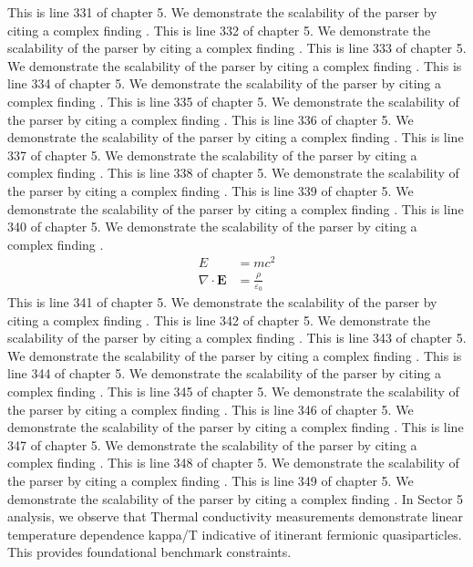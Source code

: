 This is line 331 of chapter 5. We demonstrate the scalability of the parser by citing a complex finding \cite{ref5_331}.
This is line 332 of chapter 5. We demonstrate the scalability of the parser by citing a complex finding \cite{ref5_332}.
This is line 333 of chapter 5. We demonstrate the scalability of the parser by citing a complex finding \cite{ref5_333}.
This is line 334 of chapter 5. We demonstrate the scalability of the parser by citing a complex finding \cite{ref5_334}.
This is line 335 of chapter 5. We demonstrate the scalability of the parser by citing a complex finding \cite{ref5_335}.
This is line 336 of chapter 5. We demonstrate the scalability of the parser by citing a complex finding \cite{ref5_336}.
This is line 337 of chapter 5. We demonstrate the scalability of the parser by citing a complex finding \cite{ref5_337}.
This is line 338 of chapter 5. We demonstrate the scalability of the parser by citing a complex finding \cite{ref5_338}.
This is line 339 of chapter 5. We demonstrate the scalability of the parser by citing a complex finding \cite{ref5_339}.
This is line 340 of chapter 5. We demonstrate the scalability of the parser by citing a complex finding \cite{ref5_340}.
\begin{align*}
  E &= mc^2 \\
  \nabla \cdot \mathbf{E} &= \frac{\rho}{\varepsilon_0}
\end{align*}
This is line 341 of chapter 5. We demonstrate the scalability of the parser by citing a complex finding \cite{ref5_341}.
This is line 342 of chapter 5. We demonstrate the scalability of the parser by citing a complex finding \cite{ref5_342}.
This is line 343 of chapter 5. We demonstrate the scalability of the parser by citing a complex finding \cite{ref5_343}.
This is line 344 of chapter 5. We demonstrate the scalability of the parser by citing a complex finding \cite{ref5_344}.
This is line 345 of chapter 5. We demonstrate the scalability of the parser by citing a complex finding \cite{ref5_345}.
This is line 346 of chapter 5. We demonstrate the scalability of the parser by citing a complex finding \cite{ref5_346}.
This is line 347 of chapter 5. We demonstrate the scalability of the parser by citing a complex finding \cite{ref5_347}.
This is line 348 of chapter 5. We demonstrate the scalability of the parser by citing a complex finding \cite{ref5_348}.
This is line 349 of chapter 5. We demonstrate the scalability of the parser by citing a complex finding \cite{ref5_349}.
In Sector 5 analysis, we observe that Thermal conductivity measurements demonstrate linear temperature dependence kappa/T indicative of itinerant fermionic quasiparticles. This provides foundational benchmark constraints.
